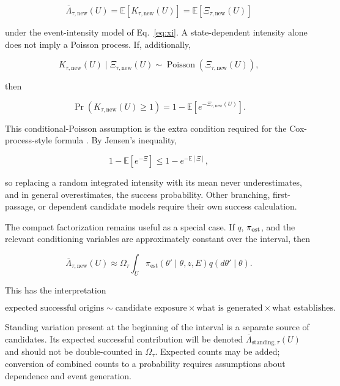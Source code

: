 \documentclass[11pt,a4paper]{article}
\begin{document}
\begin{equation}
\overline\Lambda_{\tau,\mathrm{new}}(U)
=
\mathbb E[K_{\tau,\mathrm{new}}(U)]
=
\mathbb E[\Xi_{\tau,\mathrm{new}}(U)]
\label{eq:expected-success-count}
\end{equation}

under the event-intensity model of Eq.~\eqref{eq:xi}. A state-dependent intensity alone does not imply a Poisson process. If, additionally,

\begin{equation}
K_{\tau,\mathrm{new}}(U)\mid\Xi_{\tau,\mathrm{new}}(U)
\sim
\operatorname{Poisson}\!\left(\Xi_{\tau,\mathrm{new}}(U)\right),
\label{eq:conditional-poisson}
\end{equation}

then

\begin{equation}
\Pr(K_{\tau,\mathrm{new}}(U)\ge1)
=
1-\mathbb E\!\left[e^{-\Xi_{\tau,\mathrm{new}}(U)}\right].
\label{eq:success-probability}
\end{equation}

This conditional-Poisson assumption is the extra condition required for the Cox-process-style formula \citep{LastPenrose2017}. By Jensen's inequality,

\begin{equation}
1-\mathbb E[e^{-\Xi}]
\le
1-e^{-\mathbb E[\Xi]},
\label{eq:jensen}
\end{equation}

so replacing a random integrated intensity with its mean never underestimates, and in general overestimates, the success probability. Other branching, first-passage, or dependent candidate models require their own success calculation.

The compact factorization remains useful as a special case. If $q$, $\pi_{\rm est}$, and the relevant conditioning variables are approximately constant over the interval, then

\begin{equation}
\overline\Lambda_{\tau,\mathrm{new}}(U)
\approx
\Omega_\tau
\int_U
\pi_{\mathrm{est}}(\theta'\mid\theta,z,E)
q(d\theta'\mid\theta).
\label{eq:factorized-count}
\end{equation}

This has the interpretation

\[
\boxed{
\text{expected successful origins}
\sim
\text{candidate exposure}
\times
\text{what is generated}
\times
\text{what establishes}.
}
\]

Standing variation present at the beginning of the interval is a separate source of candidates. Its expected successful contribution will be denoted $\overline\Lambda_{\mathrm{standing},\tau}(U)$ and should not be double-counted in $\Omega_\tau$. Expected counts may be added; conversion of combined counts to a probability requires assumptions about dependence and event generation.
\end{document}
